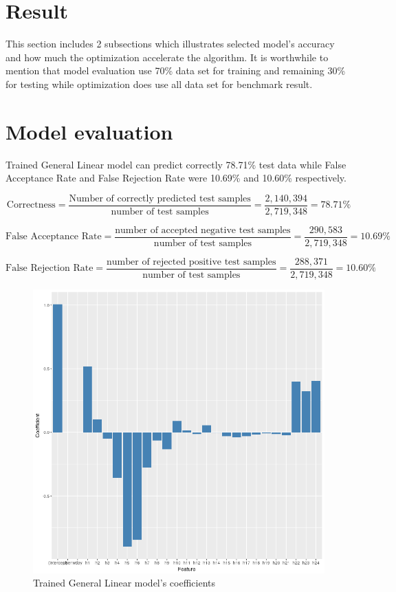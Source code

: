 \documentclass[English]{dicomopapers}
\begin{document}
\section{Result}
 This section includes 2 subsections which illustrates selected model's accuracy and how much the optimization accelerate the algorithm. It is worthwhile to mention that model evaluation use 70\% data set for training and remaining 30\% for testing while optimization does use all data set for benchmark result.
\section{Model evaluation}
 Trained General Linear model can predict correctly 78.71\% test data while False Acceptance Rate and False Rejection Rate were 10.69\% and 10.60\% respectively.
\begin{center}
  \[ \text{Correctness} = \frac{\text{Number of correctly predicted test samples}}{\text{number of test samples}} = \frac{2,140,394}{2,719,348}=78.71\% \]
\end{center}
\begin{center}
  \[ \text{False Acceptance Rate} = \frac{\text{number of accepted negative test samples}}{\text{number of test samples}} = \frac{290,583}{2,719,348}=10.69\% \]
\end{center}
\begin{center}
  \[ \text{False Rejection Rate} = \frac{\text{number of rejected positive test samples}}{\text{number of test samples}} = \frac{288,371}{2,719,348}=10.60\% \]
\end{center}
\begin{figure}[ht]
  \centering
  \includegraphics[width=\textwidth/3,natwidth=827,natheight=805]{glm_coef.png}
  \caption{Trained General Linear model's coefficients}\label{fig:glm_coef}
\end{figure}
\end{document}
